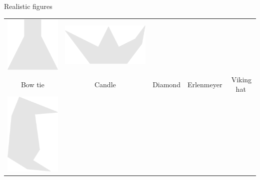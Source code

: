 \documentclass[14pt]{beamer}
\begin{document}
\begin{frame}{Realistic figures}
\begin{center}
{\begin{tabular}{ccccc}
                \includegraphics[scale=0.21]{figures/figure026g.pdf} &
                \includegraphics[scale=0.21]{figures/figure026a.pdf} \\
                Bow tie & Candle & Diamond & Erlenmeyer & \;\,Viking hat\\[2ex]
                \includegraphics[scale=0.21]{figures/figure026q.pdf}\!\!\!\! &

\end{tabular}}
\end{center}
\end{frame}
\end{document}
